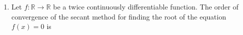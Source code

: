 \documentclass[journal,,12pt,onecolumn]{IEEEtran}
\theoremstyle{remark}
\begin{document}
\begin{enumerate}
\bigskip

\item  Let $ f : \mathbb{R} \to \mathbb{R} $ be a twice continuously differentiable function. The order of convergence of the secant method for finding the root of the equation $ f(x) = 0 $ is 
\begin{enumerate}
\end{enumerate}

\bigskip


\end{enumerate}
\end{document}
